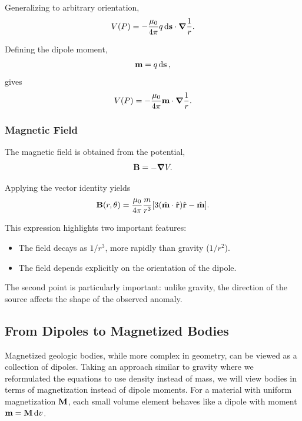 Generalizing to arbitrary orientation,
\begin{equation*}
    V(P) = - \frac{\mu_0}{4 \pi} q \dd{\vb{s}} \cdot \grad \frac{1}{r}.
\end{equation*}

Defining the dipole moment,
\begin{equation}
    \vb{m} = q \dd{\vb{s}},
\end{equation}
gives
\begin{equation}
    V(P) = -\frac{\mu_0}{4 \pi} \vb{m} \cdot \grad \frac{1}{r}.
\end{equation}

\subsubsection{Magnetic Field}

The magnetic field is obtained from the potential,
\begin{equation}
    \vb{B} = - \grad V.
\end{equation}

Applying the vector identity yields
\begin{equation}
    \vb{B}(r,\theta) = \frac{\mu_0}{4 \pi} \frac{m}{r^3}
    [3(\hat{\vb{m}} \cdot \hat{\vb{r}})\hat{\vb{r}} - \hat{\vb{m}}].
\end{equation}

This expression highlights two important features:

\begin{itemize}
    \item The field decays as $1/r^3$, more rapidly than gravity ($1/r^2$).
    \item The field depends explicitly on the orientation of the dipole.
\end{itemize}

The second point is particularly important: unlike gravity, the direction of the source affects the shape of the observed anomaly.

\subsection{From Dipoles to Magnetized Bodies}

Magnetized geologic bodies, while more complex in geometry, can be viewed as a collection of dipoles.  Taking an approach similar to gravity where we reformulated the equations to use density instead of mass, we will view bodies in terms of magnetization instead of dipole moments.  For a material with uniform magnetization $\vb{M}$, each small volume element behaves like a dipole with moment $\vb{m} = \vb{M} \dd{v}$.

